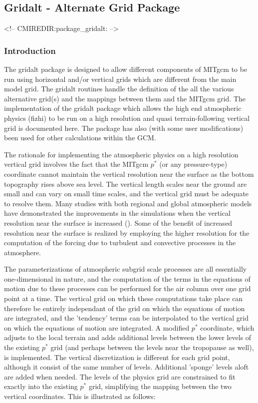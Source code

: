 \subsection{Gridalt - Alternate Grid Package}
\label{sec:pkg:gridalt}
\begin{rawhtml}
<!-- CMIREDIR:package_gridalt: -->
\end{rawhtml}

\subsubsection {Introduction} 

The gridalt package is designed to allow different components of MITgcm to
be run using horizontal and/or vertical grids which are different from the main 
model grid. The gridalt routines handle the definition of the all the various
alternative grid(s) and the mappings between them and the MITgcm grid.
The implementation of the gridalt package which allows the high end atmospheric 
physics (fizhi) to be run on a high resolution and quasi terrain-following vertical 
grid is documented here.  The package has also (with some user modifications) been used 
for other calculations within the GCM. 

The rationale for implementing the atmospheric physics on a high resolution vertical
grid involves the fact that the MITgcm $p^*$ (or any pressure-type) coordinate cannot 
maintain the vertical resolution near the surface as the bottom topography rises above
sea level. The vertical length scales near the ground are small and can vary 
on small time scales, and the vertical grid must be adequate to resolve them.
Many studies with both regional and global atmospheric models have demonstrated the 
improvements in the simulations when the vertical resolution near the surface is 
increased (\cite{bm:99,Inn:01,wo:98,breth:99}). Some of the benefit of increased resolution 
near the surface is realized by employing the higher resolution for the computation of the 
forcing due to turbulent and convective processes in the atmosphere.  

The parameterizations of atmospheric subgrid scale processes are all essentially
one-dimensional in nature, and the computation of the terms in the equations of
motion due to these processes can be performed for the air column over one grid point 
at a time.  The vertical grid on which these computations take place can therefore be 
entirely independant of the grid on which the equations of motion are integrated, and 
the 'tendency' terms can be interpolated to the vertical grid on which the equations
of motion are integrated. A modified $p^*$ coordinate, which adjusts to the local 
terrain and adds additional levels between the lower levels of the existing $p^*$ grid 
(and perhaps between the levels near the tropopause as well), is implemented. The 
vertical discretization is different for each grid point, although it consist of the 
same number of levels. Additional 'sponge' levels aloft are added when needed. The levels 
of the physics grid are constrained to fit exactly into the existing $p^*$ grid, simplifying 
the mapping between the two vertical coordinates.  This is illustrated as follows:

